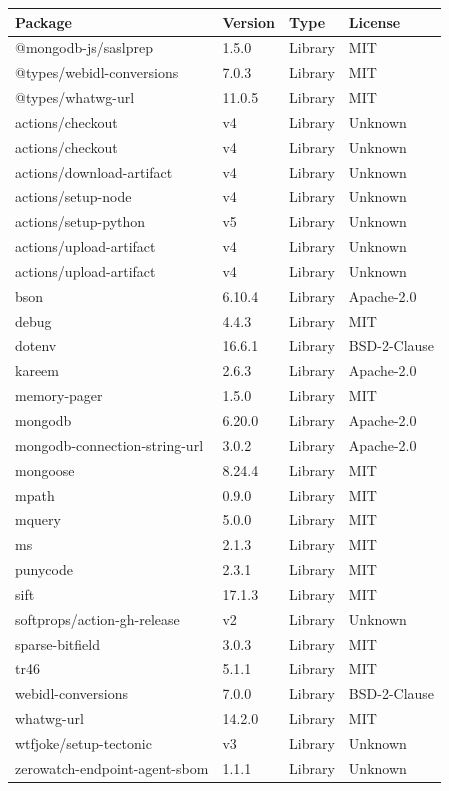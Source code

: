 \begin{longtable}{p{4.5cm}p{2.3cm}p{2cm}p{3.5cm}}
\toprule
\rowcolor{ZWPrimary}
\textbf{\color{white}Package} & \textbf{\color{white}Version} & \textbf{\color{white}Type} & \textbf{\color{white}License} \\
\midrule
\endhead
@mongodb-js/saslprep & 1.5.0 & Library & MIT \\
@types/webidl-conversions & 7.0.3 & Library & MIT \\
@types/whatwg-url & 11.0.5 & Library & MIT \\
actions/checkout & v4 & Library & Unknown \\
actions/checkout & v4 & Library & Unknown \\
actions/download-artifact & v4 & Library & Unknown \\
actions/setup-node & v4 & Library & Unknown \\
actions/setup-python & v5 & Library & Unknown \\
actions/upload-artifact & v4 & Library & Unknown \\
actions/upload-artifact & v4 & Library & Unknown \\
bson & 6.10.4 & Library & Apache-2.0 \\
debug & 4.4.3 & Library & MIT \\
dotenv & 16.6.1 & Library & BSD-2-Clause \\
kareem & 2.6.3 & Library & Apache-2.0 \\
memory-pager & 1.5.0 & Library & MIT \\
mongodb & 6.20.0 & Library & Apache-2.0 \\
mongodb-connection-string-url & 3.0.2 & Library & Apache-2.0 \\
mongoose & 8.24.4 & Library & MIT \\
mpath & 0.9.0 & Library & MIT \\
mquery & 5.0.0 & Library & MIT \\
ms & 2.1.3 & Library & MIT \\
punycode & 2.3.1 & Library & MIT \\
sift & 17.1.3 & Library & MIT \\
softprops/action-gh-release & v2 & Library & Unknown \\
sparse-bitfield & 3.0.3 & Library & MIT \\
tr46 & 5.1.1 & Library & MIT \\
webidl-conversions & 7.0.0 & Library & BSD-2-Clause \\
whatwg-url & 14.2.0 & Library & MIT \\
wtfjoke/setup-tectonic & v3 & Library & Unknown \\
zerowatch-endpoint-agent-sbom & 1.1.1 & Library & Unknown \\
\bottomrule
\end{longtable}

